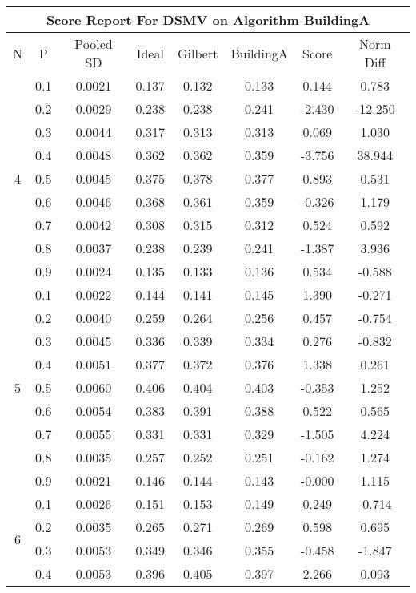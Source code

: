 \documentclass[11pt,a4paper]{report}
\begin{document}
\begin{longtable}{ | c | c || c | c | c | c | c | c | }
\hline
\multicolumn{8}{|c|}{ Score Report For DSMV on Algorithm BuildingA} \\
\hline
N & P & Pooled SD &  Ideal &  Gilbert & BuildingA  & Score & Norm Diff \\
 \hline
 \hline
 \endhead
\multirow{9}{*}{4} & 0.1 & 0.0021 & 0.137 & 0.132 & 0.133 & 0.144 & 0.783 \\
 & 0.2 & 0.0029 & 0.238 & 0.238 & 0.241 & -2.430 & -12.250 \\
 & 0.3 & 0.0044 & 0.317 & 0.313 & 0.313 & 0.069 & 1.030 \\
 & 0.4 & 0.0048 & 0.362 & 0.362 & 0.359 & -3.756 & 38.944 \\
 & 0.5 & 0.0045 & 0.375 & 0.378 & 0.377 & 0.893 & 0.531 \\
 & 0.6 & 0.0046 & 0.368 & 0.361 & 0.359 & -0.326 & 1.179 \\
 & 0.7 & 0.0042 & 0.308 & 0.315 & 0.312 & 0.524 & 0.592 \\
 & 0.8 & 0.0037 & 0.238 & 0.239 & 0.241 & -1.387 & 3.936 \\
 & 0.9 & 0.0024 & 0.135 & 0.133 & 0.136 & 0.534 & -0.588 \\
 \hline
\multirow{9}{*}{5} & 0.1 & 0.0022 & 0.144 & 0.141 & 0.145 & 1.390 & -0.271 \\
 & 0.2 & 0.0040 & 0.259 & 0.264 & 0.256 & 0.457 & -0.754 \\
 & 0.3 & 0.0045 & 0.336 & 0.339 & 0.334 & 0.276 & -0.832 \\
 & 0.4 & 0.0051 & 0.377 & 0.372 & 0.376 & 1.338 & 0.261 \\
 & 0.5 & 0.0060 & 0.406 & 0.404 & 0.403 & -0.353 & 1.252 \\
 & 0.6 & 0.0054 & 0.383 & 0.391 & 0.388 & 0.522 & 0.565 \\
 & 0.7 & 0.0055 & 0.331 & 0.331 & 0.329 & -1.505 & 4.224 \\
 & 0.8 & 0.0035 & 0.257 & 0.252 & 0.251 & -0.162 & 1.274 \\
 & 0.9 & 0.0021 & 0.146 & 0.144 & 0.143 & -0.000 & 1.115 \\
 \hline
\multirow{9}{*}{6} & 0.1 & 0.0026 & 0.151 & 0.153 & 0.149 & 0.249 & -0.714 \\
 & 0.2 & 0.0035 & 0.265 & 0.271 & 0.269 & 0.598 & 0.695 \\
 & 0.3 & 0.0053 & 0.349 & 0.346 & 0.355 & -0.458 & -1.847 \\
 & 0.4 & 0.0053 & 0.396 & 0.405 & 0.397 & 2.266 & 0.093 \\

\end{longtable}
\end{document}
